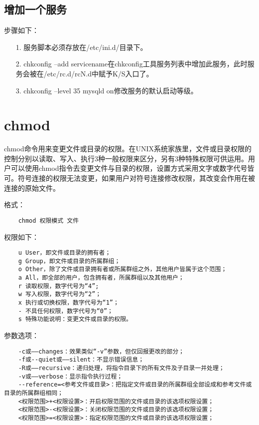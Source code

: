 \documentclass[a4paper,left=2.5cm,right=2.5cm,11pt]{article}
\begin{document}
\subsection{增加一个服务}
	步骤如下：
	\begin{itemize}
		\item[1.] 服务脚本必须存放在/etc/ini.d/目录下。
		\item[2.] chkconfig --add servicename在chkconfig工具服务列表中增加此服务，此时服务会被在/etc/rc.d/rcN.d中赋予K/S入口了。
		\item[3.] chkconfig --level 35 mysqld on修改服务的默认启动等级。 
	\end{itemize}

\section{chmod}
	chmod命令用来变更文件或目录的权限。在UNIX系统家族里，文件或目录权限的控制分别以读取、写入、执行3种一般权限来区分，另有3种特殊权限可供运用。用户可以使用chmod指令去变更文件与目录的权限，设置方式采用文字或数字代号皆可。符号连接的权限无法变更，如果用户对符号连接修改权限，其改变会作用在被连接的原始文件。\par

	格式：
	\begin{lstlisting}
	chmod 权限模式 文件
	\end{lstlisting}

	权限如下：
	\begin{lstlisting}
	u User，即文件或目录的拥有者； 
	g Group，即文件或目录的所属群组； 
	o Other，除了文件或目录拥有者或所属群组之外，其他用户皆属于这个范围； 
	a All，即全部的用户，包含拥有者，所属群组以及其他用户； 
	r 读取权限，数字代号为“4”; 
	w 写入权限，数字代号为“2”； 
	x 执行或切换权限，数字代号为“1”； 
	- 不具任何权限，数字代号为“0”； 
	s 特殊功能说明：变更文件或目录的权限。
	\end{lstlisting}

	参数选项：
	\begin{lstlisting}
	-c或——changes：效果类似“-v”参数，但仅回报更改的部分； 
	-f或--quiet或——silent：不显示错误信息； 
	-R或——recursive：递归处理，将指令目录下的所有文件及子目录一并处理； 
	-v或——verbose：显示指令执行过程； 
	--reference=<参考文件或目录>：把指定文件或目录的所属群组全部设成和参考文件或目录的所属群组相同； 
	<权限范围>+<权限设置>：开启权限范围的文件或目录的该选项权限设置； 
	<权限范围>-<权限设置>：关闭权限范围的文件或目录的该选项权限设置； 
	<权限范围>=<权限设置>：指定权限范围的文件或目录的该选项权限设置；
	\end{lstlisting}
\end{document}
